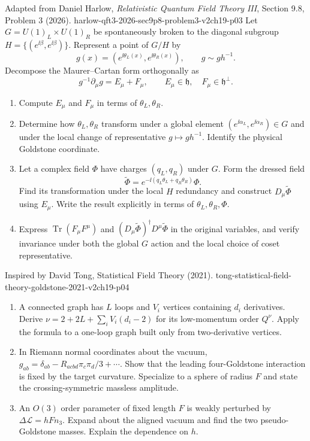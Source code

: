 \begin{enumerate}
  {Adapted from Daniel Harlow, \emph{Relativistic Quantum Field Theory III},
  Section 9.8, Problem 3 (2026).}
  {harlow-qft3-2026-sec9p8-problem3-v2ch19-p03}
  Let
  \(G=U(1)_L\times U(1)_R\) be spontaneously broken to the diagonal
  subgroup
  \(H=\{(e^{\ii\beta},e^{\ii\beta})\}\).  Represent a point of \(G/H\) by
  \[
    g(x)=(e^{\ii\theta_L(x)},e^{\ii\theta_R(x)}),
    \qquad g\sim gh^{-1}.
  \]
  Decompose the Maurer--Cartan form orthogonally as
  \[
    g^{-1}\partial_\mu g=E_\mu+F_\mu,\qquad
    E_\mu\in\mathfrak h,\quad F_\mu\in\mathfrak h^\perp .
  \]
  \begin{enumerate}
    \item[(a)]
    Compute \(E_\mu\) and \(F_\mu\) in terms of
    \(\theta_L,\theta_R\).
    \item[(b)]
    Determine how \(\theta_L,\theta_R\) transform under a global element
    \((e^{\ii\alpha_L},e^{\ii\alpha_R})\in G\) and under the local change of
    representative \(g\mapsto gh^{-1}\).  Identify the physical Goldstone
    coordinate.
    \item[(c)]
    Let a complex field \(\Phi\) have charges \((q_L,q_R)\) under \(G\).
    Form the dressed field
    \[
      \widetilde\Phi
        =e^{-\ii(q_L\theta_L+q_R\theta_R)}\Phi .
    \]
    Find its transformation under the local \(H\) redundancy and construct
    \(D_\mu\widetilde\Phi\) using \(E_\mu\).  Write the result explicitly
    in terms of \(\theta_L,\theta_R,\Phi\).
    \item[(d)]
    Express
    \(\operatorname{Tr}(F_\mu F^\mu)\) and
    \((D_\mu\widetilde\Phi)^\dagger
      D^\mu\widetilde\Phi\)
    in the original variables, and verify invariance under both the global
    \(G\) action and the local choice of coset representative.
  \end{enumerate}

  {Inspired by David Tong, Statistical Field Theory (2021).}
  {tong-statistical-field-theory-goldstone-2021-v2ch19-p04}
  \begin{enumerate}
    \item[(a)]
    A connected graph has \(L\) loops and \(V_i\) vertices containing
    \(d_i\) derivatives.  Derive
    \(\nu=2+2L+\sum_iV_i(d_i-2)\) for its low-momentum order \(Q^\nu\).
    Apply the formula to a one-loop graph built only from two-derivative
    vertices.
    \item[(b)]
    In Riemann normal coordinates about the vacuum,
    \(g_{ab}=\delta_{ab}-R_{acbd}\pi_c\pi_d/3+\cdots\).
    Show that the leading four-Goldstone interaction is fixed by the target
    curvature.  Specialize to a sphere of radius \(F\) and state the
    crossing-symmetric massless amplitude.
    \item[(c)]
    An \(O(3)\) order parameter of fixed length \(F\) is weakly perturbed by
    \(\Delta\mathcal L=hF n_3\).  Expand about the aligned vacuum and find
    the two pseudo-Goldstone masses.  Explain the dependence on \(h\).
  \end{enumerate}


\end{enumerate}
